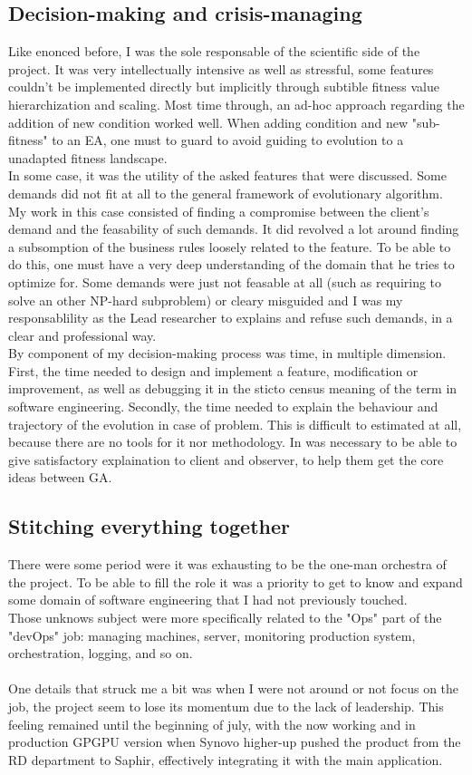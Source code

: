 \documentclass[12pt]{memoir}
\begin{document}
\subsection{Decision-making and crisis-managing}
Like enonced before, I was the sole responsable of the scientific side of the project.
 It was very intellectually intensive as well as stressful, some features couldn't be 
implemented directly but implicitly through subtible fitness value hierarchization and
 scaling. Most time through, an ad-hoc approach regarding the addition of new condition 
worked well. When adding condition and new "sub-fitness" to an EA, one must to guard to
 avoid guiding to evolution to a unadapted fitness landscape. \\
In some case, it was the utility of the asked features that were discussed. Some demands
 did not fit at all to the general framework of evolutionary algorithm. My work in this
 case consisted of finding a compromise between the client's demand and the feasability
 of such demands. It did revolved a lot around finding a subsomption of the business 
rules loosely related to the feature. To be able to do this, one must have a very deep
 understanding of the domain that he tries to optimize for. Some demands were just not 
feasable at all (such as requiring to solve an other NP-hard subproblem) or cleary
 misguided and I was my responsablility as the Lead researcher to explains and refuse
 such demands, in a clear and professional way.\\
By component of my decision-making process was time, in multiple dimension. First, the time
 needed to design and implement a feature, modification or improvement, as well as 
debugging it in the sticto census meaning of the term in software engineering. Secondly, 
the time needed to explain the behaviour and trajectory of the evolution in case of problem. 
This is difficult to estimated at all, because there are no tools for it nor methodology. 
In was necessary to be able to give satisfactory explaination to client and observer, 
to help them get the core ideas between GA.

\subsection{Stitching everything together}
There were some period were it was exhausting to be the one-man orchestra of the project.
To be able to fill the role it was a priority to get to know and expand some domain of 
software engineering that I had not previously touched. \\
Those unknows subject were more specifically related to the "Ops" part of the "devOps" 
job: managing machines, server, monitoring production system, orchestration, logging, and so on.\\
\\
One details that struck me a bit was when I were not around or not focus on the job, 
the project seem to lose its momentum due to the lack of leadership. This feeling 
remained until the beginning of july, with the now working and in production GPGPU 
version when Synovo higher-up pushed the product from the RD department to Saphir, 
effectively integrating it with the main application.
\end{document}

